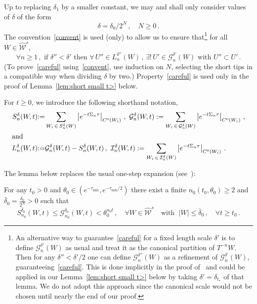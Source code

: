 \documentclass[AHL,Unicode,longabstracts,published]{cedram}
\newcommand{\cG}{\mathcal{G}}
\newcommand{\cI}{\mathcal{I}}
\newcommand{\cW}{\mathcal{W}}
\newcommand{\hW}{\widehat{\cW}}
\let\oldexists\exists
\renewcommand*{\exists}{\mathrel{\oldexists}}
\let\oldforall\forall
\renewcommand*{\forall}{\mathrel{\oldforall}}
\begin{document}
Up to replacing $\delta_1$ by a smaller constant, we may and shall only consider values of $\delta$ of the form
\begin{equation}\label{convent}
\delta=\delta_0/2^N\,, \quad N\ge 0\,.
\end{equation}
The convention~\eqref{convent} is used (only) to allow us to ensure that\footnote{ An alternative way to guarantee~\eqref{careful} for a fixed length scale $\delta'$ is to define $\cG_n^{\delta'}(W)$ as usual and treat it as the canonical partition of $T^{-n}W$. Then for any $\delta'' < \delta'/2$ one can define $\cG_n^{\delta''}(W)$ as a refinement of $\cG_n^{\delta'}(W)$, guaranteeing~\eqref{careful}. This is done implicitly in the proof of~\cite[Lemma~3.11]{BD2} and could be applied in our Lemma~\ref{lem:short small t>} below by taking $\delta' = \delta_{t_*}$ of that lemma. We do not adopt this approach since the canonical scale would not be chosen until nearly the end of our proof.} for all $W\in \hW^s$,
\begin{equation}\label{careful}
\forall n\ge 1\,, \text{ if } \delta'' <\delta'
\text{ then } \forall \, U'' \in L^{\delta''}_n(W) \,, \, \exists! \, U'\in \cG^{\delta'}_n(W) \text{ with } U''\subset U'\,.
\end{equation}
(To prove~\eqref{careful} using~\eqref{convent}, use induction on $N$, selecting the short tips in a compatible way when dividing $\delta$ by two.) Property~\eqref{careful} is used only in the proof of Lemma~\ref{lem:short small t>} below.


For $t\ge 0$, we introduce the following shorthand notation,
\begin{align*}
S_{n}^{ \delta}(W,t) &{:=}
\sum_{W_i\,\in\,S_{n}^{ \delta}(W)} \left|e^{-t \Sigma_{n} \tau}\right|_{C^0(W_i)}
\,,\,\,
\cG_{n}^{ \delta}(W,t):=
\sum_{W_i\,\in\,\cG_{n}^{ \delta}(W)} \left|e^{-t\Sigma_{n} \tau }\right|_{C^0(W_i)}\,,
\\
\intertext{and}
L_{n}^{ \delta}(W,t) &{:=}\cG_{n}^{ \delta}(W,t)-S_{n}^{ \delta}(W,t)\,, \, \, \cI^{\delta}_n(W,t) :=\sum_{W_i\,\in \,\cI_{n}^{ \delta}(W)} \left|e^{-t\Sigma_{n} \tau }\right|_{C^0(W_i)}\,.
\end{align*}

The lemma below replaces the usual one-step expansion (see~\cite[Lemma~3.1]{BD2}):

\begin{lemm}\label{lem:N step}
For any $t_0>0$ and $\theta_0 \in (e^{- \tau_{\min}},e^{- \tau_{\min}/2})$ there exist a finite $n_0(t_0, \theta_0) \ge 2$ and $ \bar \delta_0=\frac{\delta_0}{2^N}>0$ such that
\begin{equation}\label{eq:theta}
S_{n_0}^{\bar\delta_0}(W,t) \le \cG_{n_0}^{\delta_0}(W,t) < \theta_0^{n_0 t}\,,\quad\forall W \in \hW^s
\quad\text{with }\; |W|\le \bar \delta_0 \,,\quad
\forall t\ge t_0 \,.
\end{equation}
\end{lemm}
\end{document}
